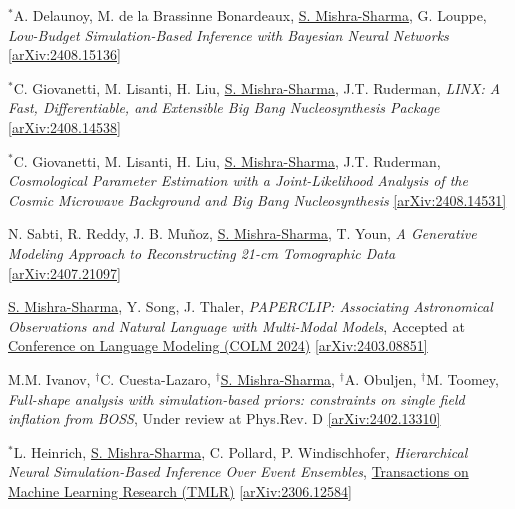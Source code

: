 \documentclass[letterpaper,11pt]{article}
\newenvironment{packed_enumerate}[1][]{
\begin{etaremune}[#1]
  \setlength{\itemsep}{3.7pt}
  \setlength{\parskip}{0pt}
  \setlength{\parsep}{0pt}}{\end{etaremune}
}
\begin{document}
\begin{packed_enumerate}[start=43]

  
    \item $^*$A. Delaunoy, M. de la Brassinne Bonardeaux, \underline{S. Mishra-Sharma}, G. Louppe, \emph{Low-Budget Simulation-Based Inference with Bayesian Neural Networks} \href{https://arxiv.org/abs/2408.15136}{[arXiv:2408.15136]}

   \item $^*$C. Giovanetti, M. Lisanti, H. Liu, \underline{S. Mishra-Sharma}, J.T. Ruderman, \emph{LINX: A Fast, Differentiable, and Extensible Big Bang Nucleosynthesis Package} \href{https://arxiv.org/abs/2408.14538}{[arXiv:2408.14538]}

  \item $^*$C. Giovanetti, M. Lisanti, H. Liu, \underline{S. Mishra-Sharma}, J.T. Ruderman, \emph{Cosmological Parameter Estimation with a Joint-Likelihood Analysis of the Cosmic Microwave Background and Big Bang Nucleosynthesis} \href{https://arxiv.org/abs/2408.14531}{[arXiv:2408.14531]}

  \item N. Sabti, R. Reddy, J. B. Muñoz, \underline{S. Mishra-Sharma}, T. Youn, \emph{A Generative Modeling Approach to Reconstructing 21-cm Tomographic Data}  \href{https://arxiv.org/abs/2407.21097}{[arXiv:2407.21097]}

  \item \underline{S. Mishra-Sharma}, Y. Song, J. Thaler, \emph{PAPERCLIP: Associating Astronomical Observations and Natural Language with Multi-Modal Models}, Accepted at \href{https://colmweb.org/}{Conference on Language Modeling (COLM 2024)}  \href{https://arxiv.org/abs/2403.08851}{[arXiv:2403.08851]}

  \item M.M. Ivanov, $^{\dagger}$C. Cuesta-Lazaro, $^{\dagger}$\underline{S. Mishra-Sharma}, $^{\dagger}$A. Obuljen, $^{\dagger}$M. Toomey, \emph{Full-shape analysis with simulation-based priors: constraints on single field inflation from BOSS}, Under review at Phys.Rev. {D} \href{https://arxiv.org/abs/2402.13310}{[arXiv:2402.13310]}

  \item $^*$L. Heinrich, \underline{S. Mishra-Sharma}, C. Pollard, P. Windischhofer, \emph{Hierarchical Neural Simulation-Based Inference Over Event Ensembles}, \href{https://openreview.net/forum?id=Jy2IgzjoFH&referrer=%5BAuthor%20Console%5D(%2Fgroup%3Fid%3DTMLR%2FAuthors%23your-submissions)}{Transactions on Machine Learning Research (TMLR)} \href{https://arxiv.org/abs/2306.12584}{[arXiv:2306.12584]}


\end{packed_enumerate}
\end{document}
